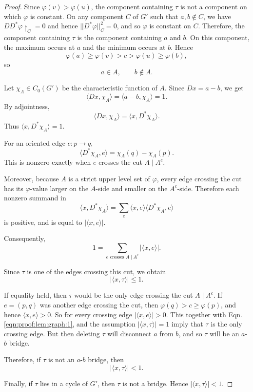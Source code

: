 \documentclass[11pt]{amsart}
\theoremstyle{theorem}
\theoremstyle{remark}
\theoremstyle{definition}
\newcommand {\la}   {{\langle}}
\newcommand {\ra}   {{\rangle}}
\begin{document}
\begin{proof}
Since \(\varphi(v)>\varphi(u)\), the component containing \(\tau\) is not a
component on which \(\varphi\) is constant.
On any  component $C$ of $G'$ such that $a,b \not\in C$, we have
$DD^*\varphi\restriction_C = 0$ and hence $||D^*\varphi||_C^2 = 0$, and so $\varphi$ is constant on $C$. 
Therefore,
the component containing \(\tau\) is the component
containing \(a\) and \(b\). On this component, the maximum occurs at \(a\) and
the minimum occurs at \(b\). Hence
\[
\varphi(a)\geq \varphi(v)>c>\varphi(u)\geq \varphi(b),
\]
so
\[
a\in A,
\qquad
b\notin A.
\]

Let \(\chi_A\in C_0(G')\) be the characteristic function of \(A\). Since
$
Dx=a-b
$,
we get
\[
\langle Dx,\chi_A\rangle
=
\langle a-b,\chi_A\rangle
=
1.
\]
By adjointness,
\[
\langle Dx,\chi_A\rangle
=
\langle x,D^*\chi_A\rangle.
\]
Thus
$
\langle x,D^*\chi_A\rangle=1
$.

For an oriented edge \(e:p\to q\),
\[
\langle D^*\chi_A,e\rangle
=
\chi_A(q)-\chi_A(p).
\]
This is nonzero exactly when \(e\) crosses the cut \(A\mid A^c\).

Moreover, because \(A\) is a strict upper level set of \(\varphi\), every edge
crossing the cut has its \(\varphi\)-value larger on the \(A\)-side and smaller
on the \(A^c\)-side. Therefore each nonzero summand in
\[
\langle x,D^*\chi_A\rangle
=
\sum_e \langle x,e\rangle\langle D^*\chi_A,e\rangle
\]
is positive, and is equal to
$
|\langle x,e\rangle|
$.

Consequently,
\[
1
=
\sum_{e\text{ crosses }A\mid A^c}
|\langle x,e\rangle|.
\]

Since \(\tau\) is one of the edges crossing this cut, we obtain
\begin{equation}
\label{eqn:proof:lem:graph:1}
|\langle x,\tau\rangle|\leq 1.
\end{equation}

If equality held, then \(\tau\) would be the only edge crossing the cut
\(A\mid A^c\). 
If $e = (p,q)$ was another edge crossing the cut, then $\varphi(q) > c \geq \varphi(p)$, and hence $\la x, e \ra > 0$. So for every crossing edge $|\la x, e \ra| > 0$. This together with Eqn. \eqref{eqn:proof:lem:graph:1}, 
and the assumption $|\langle x,\tau\rangle|= 1$ imply that $\tau$ is the only crossing edge. But then deleting \(\tau\) will disconnect \(a\) from
\(b\), and so \(\tau\) will be an \(a\)-\(b\) bridge.

Therefore, if \(\tau\) is not an \(a\)-\(b\) bridge, then
\[
|\langle x,\tau\rangle|<1.
\]

Finally, if \(\tau\) lies in a cycle of \(G'\), then \(\tau\) is not a bridge.
Hence
$
|\langle x,\tau\rangle|<1
$.
\end{proof}
\end{document}
